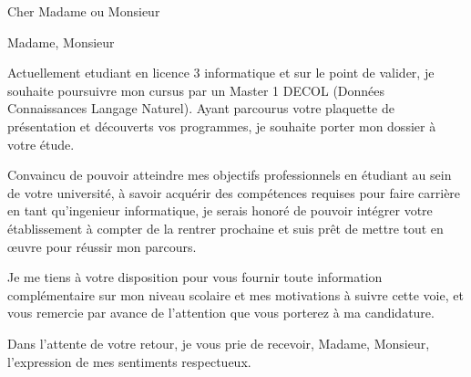 \documentclass[11pt,a4paper,sans]{moderncv}        %
\begin{document}
\date{10 Février, 2017}
\opening{Cher Madame ou Monsieur}
\makelettertitle

Madame, Monsieur

Actuellement etudiant en licence 3 informatique et sur le point de valider, je souhaite poursuivre mon cursus par un Master 1 DECOL (Données Connaissances Langage Naturel). Ayant parcourus votre plaquette de présentation et découverts vos programmes, je souhaite porter mon dossier à votre étude.

Convaincu de pouvoir atteindre mes objectifs professionnels en étudiant au sein de votre université, à savoir acquérir des compétences requises pour faire carrière en tant qu'ingenieur informatique, je serais honoré de pouvoir intégrer votre établissement à compter de la rentrer prochaine et suis prêt de mettre tout en œuvre pour réussir mon parcours.

Je me tiens à votre disposition pour vous fournir toute information complémentaire sur mon niveau scolaire et mes motivations à suivre cette voie, et vous remercie par avance de l'attention que vous porterez à ma candidature.

Dans l'attente de votre retour, je vous prie de recevoir, Madame, Monsieur, l'expression de mes sentiments respectueux.

\makeletterclosing
\end{document}
